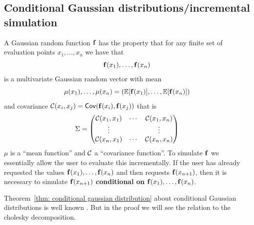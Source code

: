 \subsection{Conditional Gaussian distributions/incremental simulation}
\label{sec: conditional gaussian distribution}

A Gaussian random function \(\mathbf{f}\) has the property that for any finite
set of evaluation points \(x_1, \dots, x_n\) we have that
\[
    \mathbf{f}(x_1), \dots, \mathbf{f}(x_n)
\]
is a multivariate Gaussian random vector with mean
\[
    \mu(x_1), \dots, \mu(x_n) = (\mathbb{E}[\mathbf{f}(x_1)], \dots, \mathbb{E}[\mathbf{f}(x_n)])
\]
and covariance \(\mathcal{C}(x_i, x_j) = \mathsf{Cov}(\mathbf{f}(x_i), \mathbf{f}(x_j))\) that is
\[
    \Sigma = \begin{pmatrix}
        \mathcal{C}(x_1, x_1) & \cdots & \mathcal{C}(x_1, x_n)
        \\
        \vdots & & \vdots
        \\
        \mathcal{C}(x_n, x_1) & \cdots & \mathcal{C}(x_n, x_n)
    \end{pmatrix}
\]
\(\mu\) is a ``mean function'' and \(\mathcal{C}\) a ``covariance function''.
To simulate \(\mathbf{f}\) we essentially allow the user to evaluate this incrementally.
If the user has already requested the values \(\mathbf{f}(x_1), \dots, \mathbf{f}(x_n)\)
and then requests \(\mathbf{f}(x_{n+1})\), then it is necessary to simulate
\(\mathbf{f}(x_{n+1})\) \textbf{conditional on} \(\mathbf{f}(x_1), \dots, \mathbf{f}(x_n)\).

Theorem~\ref{thm: conditional gaussian distribution} about conditional Gaussian
distributions is well known
\citep[e.g.][Prop.~3.13.]{eatonMultivariateStatisticsVector2007}. But in the
proof we will see the relation to the cholesky decomposition.

